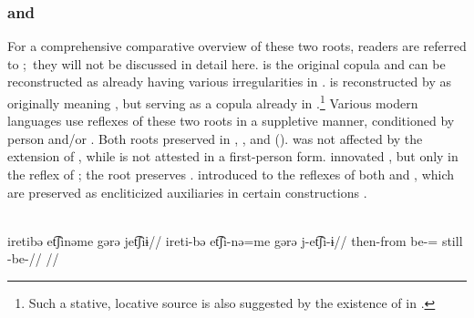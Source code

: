 
%

\subsubsection{ and  }
\label{sec:be}
For a comprehensive comparative overview of these two roots, readers are referred to \textcite[375--382]{gildea2018reconstructing}; they will not be discussed in detail here.
 is the original copula and can be reconstructed as already having various irregularities in \PC.
 is reconstructed by \textcites{meira2009property}{gildea2018reconstructing} as originally meaning , but serving as a copula already in \PC.\footnote{Such a stative, locative source is also suggested by the existence of   in \arara \parencite[196]{alves2017arara}.}
Various modern languages use reflexes of these two roots in a suppletive manner, conditioned by person and\slash{}or .
Both roots preserved   in \PPek, \PWai, and \PTir ().
\akuriyo {} was not affected by the extension of  , while  is not attested in a first-person form. 
\carijo innovated , but only in the reflex of  ; the  root preserves  .
\yukpa introduced  to the reflexes of both  and , which are preserved as encliticized auxiliaries in certain constructions .

\carijo \parencite[][177]{robayo1989rame}\\
\begingl
\glpreamble iretibə et͡ʃinəme gərə jet͡ʃiɨ//
\gla ireti-bə et͡ʃi-nə=me gərə j-et͡ʃi-ɨ//
\glb then-from be-= still -be-//
\glft {}//
\endgl
\xe

